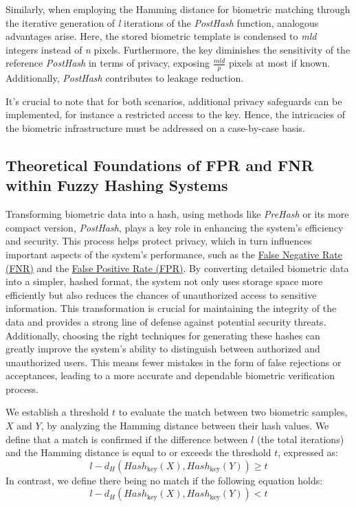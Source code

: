 Similarly, when employing the Hamming distance for biometric matching through the iterative generation of \textit{l} iterations of the \textit{PostHash} function, analogous advantages arise. Here, the stored biometric template is condensed to \textit{mld} integers instead of \textit{n} pixels. Furthermore, the key diminishes the sensitivity of the reference \textit{PostHash} in terms of privacy, exposing \(\frac{mld}{p}\) pixels at most if known. Additionally, \textit{PostHash} contributes to leakage reduction.

It's crucial to note that for both scenarios, additional privacy safeguards can be implemented, for instance a restricted access to the key. Hence, the intricacies of the biometric infrastructure must be addressed on a case-by-case basis.

\subsection{Theoretical Foundations of FPR and FNR within Fuzzy Hashing Systems}

Transforming biometric data into a hash, using methods like \textit{PreHash} or its more compact version, \textit{PostHash}, plays a key role in enhancing the system's efficiency and security. This process helps protect privacy, which in turn influences important aspects of the system's performance, such as the \hyperref[def:FNR]{False Negative Rate (FNR)} and the \hyperref[def:FPR]{False Positive Rate (FPR)}. By converting detailed biometric data into a simpler, hashed format, the system not only uses storage space more efficiently but also reduces the chances of unauthorized access to sensitive information. This transformation is crucial for maintaining the integrity of the data and provides a strong line of defense against potential security threats. Additionally, choosing the right techniques for generating these hashes can greatly improve the system's ability to distinguish between authorized and unauthorized users. This means fewer mistakes in the form of false rejections or acceptances, leading to a more accurate and dependable biometric verification process.

We establish a threshold \(t\) to evaluate the match between two biometric samples, \(X\) and \(Y\), by analyzing the Hamming distance between their hash values.
We define that a match is confirmed if the difference between \(l\) (the total iterations) and the Hamming distance is equal to or exceeds the threshold \(t\), expressed as: \[l - d_H(Hash_{\text{key}}(X), Hash_{\text{key}}(Y)) \geq t\]
In contrast, we define there being no match if the following equation holds: \[l - d_H(Hash_{\text{key}}(X), Hash_{\text{key}}(Y)) < t\]

